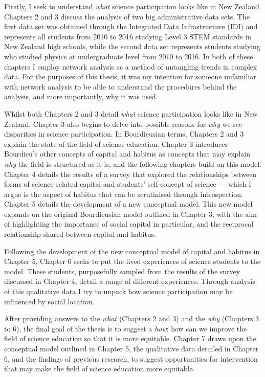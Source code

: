 Firstly, I seek to understand \textit{what} science participation looks like in New Zealand. Chapters 2 and 3 discuss the analysis of two big administrative data sets. The first data set was obtained through the Integrated Data Infrastructure (IDI) and represents all students from 2010 to 2016 studying Level 3 STEM standards in New Zealand high schools, while the second data set represents students studying who studied physics at undergraduate level from 2010 to 2016. In both of these chapters I employ network analysis as a method of untangling trends in complex data. For the purposes of this thesis, it was my intention for someone unfamiliar with network analysis to be able to understand the procedures behind the analysis, and more importantly, why it was used. 

Whilst both Chapters 2 and 3 detail \textit{what} science participation looks like in New Zealand, Chapter 3 also begins to delve into possible reasons for \textit{why} we see disparities in science participation. In Bourdieusian terms, Chapters 2 and 3 explain the state of the field of science education. Chapter 3 introduces Bourdieu's other concepts of capital and habitus as concepts that may explain \textit{why} the field is structured as it is, and the following chapters build on this model. Chapter 4 details the results of a survey that explored the relationships between forms of science-related capital and students' self-concept of science --- which I argue is the aspect of habitus that can be scrutinised through introspection. Chapter 5 details the development of a new conceptual model. This new model expands on the original Bourdieusian model outlined in Chapter 3, with the aim of highlighting the importance of social capital in particular, and the reciprocal relationship shared between capital and habitus. 

Following the development of the new conceptual model of capital and habitus in Chapter 5, Chapter 6 seeks to put the lived experiences of science students to the model. These students, purposefully sampled from the results of the survey discussed in Chapter 4, detail a range of different experiences. Through analysis of this qualitative data I try to unpack how science participation may be influenced by social location. 

After providing answers to the \textit{what} (Chapters 2 and 3) and the \textit{why} (Chapters 3 to 6), the final goal of the thesis is to suggest a \textit{how}: how can we improve the field of science education so that it is more equitable. Chapter 7 draws upon the conceptual model outlined in Chapter 5, the qualitative data detailed in Chapter 6, and the findings of previous research, to suggest opportunities for intervention that may make the field of science education more equitable. 


